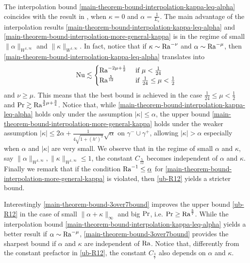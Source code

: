 \documentclass{article}
\theoremstyle{definition}
\theoremstyle{definition}
\newcommand{\Pra}{\rm{Pr}}
\newcommand{\Ra}{{\rm{Ra}}}
\newcommand{\Nu}{{\rm{Nu}}}
\begin{document}
The interpolation bound \eqref{main-theorem-bound-interpolation-kappa-leq-alpha} coincides with the result in \cite{drivasNguyenNobiliBoundsOnHeatFluxForRayleighBenardConvectionBetweenNavierSlipFixedTemperatureBoundaries}, when $\kappa=0$ and $\alpha=\frac{1}{L_s}$. The main advantage of the interpolation results \eqref{main-theorem-bound-interpolation-kappa-leq-alpha} and \eqref{main-theorem-bound-interpolation-more-general-kappa} is in the regime of small $\|\alpha\|_{W^{1,\infty}}$ and $\|\kappa\|_{W^{1,\infty}}$. In fact, notice that if $\kappa\sim \Ra^{-\nu}$ and $\alpha\sim \Ra^{-\mu}$, then \eqref{main-theorem-bound-interpolation-kappa-leq-alpha} translates into 
$$\Nu\lesssim \begin{cases} \Ra^{-2\mu+\frac 12}& \mbox{ if } \mu<\frac{1}{24}\\\Ra^{\frac{5}{12}}& \mbox{ if } \frac{1}{24}\leq\mu<\frac{1}{2}\end{cases}$$
and $\nu\geq \mu$. This means that the best bound is achieved in the case $\frac{1}{24}\leq\mu<\frac{1}{2}$ and $\Pr\gtrsim \Ra^{\frac 32\mu+\frac 34}$. Notice that, while \eqref{main-theorem-bound-interpolation-kappa-leq-alpha} holds only under the assumption $|\kappa|\leq \alpha$, the upper bound \eqref{main-theorem-bound-interpolation-more-general-kappa} holds under the weaker assumption $|\kappa|\leq 2\alpha + \frac{1}{4\sqrt{1+(h')^2}}\sqrt{\alpha}$ on $\gamma^-\cup\gamma^+$, allowing $|\kappa|>\alpha$ especially when $\alpha$ and $|\kappa|$ are very small.
We observe that in the regime of small $\alpha$ and $\kappa$, say $\|\alpha\|_{W^{1,\infty}},\|\kappa\|_{W^{1,\infty}}\leq 1$, the constant $C_\frac{5}{12}$ becomes independent of $\alpha$ and $\kappa$.
Finally we remark that if the condition $\Ra^{-1}\leq \underline{\alpha}$ for \eqref{main-theorem-bound-interpolation-more-general-kappa} is violated, then \eqref{ub-R12} yields a stricter bound.

Interestingly \eqref{main-theorem-bound-3over7bound} improves the upper bound \eqref{ub-R12} in the case of small $\|\alpha+\kappa\|_\infty$ and big $\Pra$, i.e. $\Pra\geq \Ra^\frac{5}{7}$. While the interpolation bound \eqref{main-theorem-bound-interpolation-kappa-leq-alpha} yields a better result if $\alpha\sim \Ra^{-\mu}$, \eqref{main-theorem-bound-3over7bound} provides the sharpest bound if $\alpha$ and $\kappa$ are independent of $\Ra$. Notice that, differently from the constant prefactor in \eqref{ub-R12}, the constant $C_{\frac 37}$ also depends on $\alpha$ and $\kappa$. 
\end{document}
